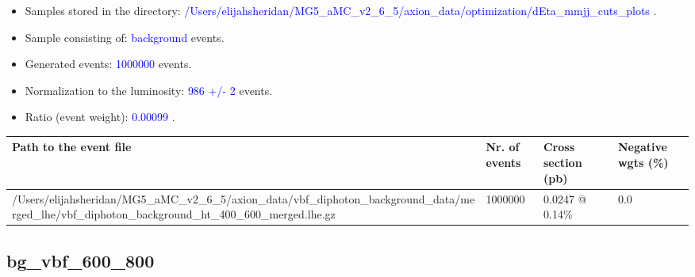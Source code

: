 \documentclass[a4paper, 10pt]{article}
\begin{document}
\begin{itemize}
  \item Samples stored in the directory: \textcolor{blue}{/\-Users/\-elijahsheridan/\-MG5\_aMC\_v2\_6\_5/\-axion\_data/\-optimization/\-dEta\_mmjj\_cuts\_plots} .
   \item Sample consisting of: \textcolor{blue}{background}  events.
   \item Generated events: \textcolor{blue}{1000000 }  events.
   \item Normalization to the luminosity: \textcolor{blue}{986}\textcolor{blue}{ +/\-- }\textcolor{blue}{2 }  events.
   \item Ratio (event weight): \textcolor{blue}{0.00099 } .  
 
\end{itemize}
\begin{table}[H]
  \begin{center}
    \begin{tabular}{|m{55.0mm}|m{25.0mm}|m{30.0mm}|m{30.0mm}|}
      \hline
      {\cellcolor{yellow}         Path to the event file}& {\cellcolor{yellow}         Nr. of events}& {\cellcolor{yellow}         Cross section (pb)}& {\cellcolor{yellow}         Negative wgts (\%)}\\
      \hline
      {\cellcolor{white}          /\-Users/\-elijahsheridan/\-MG5\_aMC\_v2\_6\_5/\-axion\_data/\-vbf\_diphoton\_background\_data/\-merged\_lhe/\-vbf\_diphoton\_background\_ht\_400\_600\_merged.lhe.gz}& {\cellcolor{white}          1000000}& {\cellcolor{white}          0.0247 @ 0.14\%}& {\cellcolor{white}          0.0}\\
\hline
    \end{tabular}
  \end{center}
\end{table}

\subsection{ bg\_vbf\_600\_800}
\end{document}
